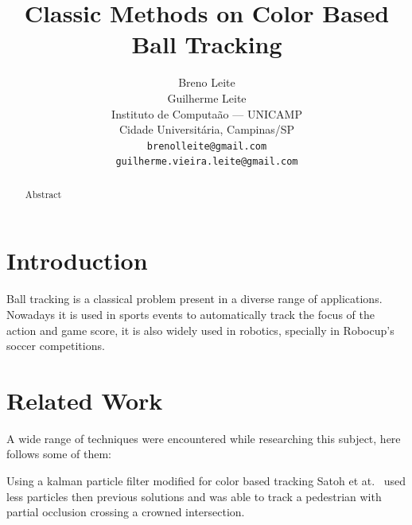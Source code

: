 \documentclass[10pt,twocolumn,letterpaper]{article}
\begin{document}
\title{Classic Methods on Color Based Ball Tracking}

\author{Breno Leite\\ Guilherme Leite\\
Instituto de Computa\cc\~ao --- UNICAMP\\
Cidade Universit\'aria, Campinas/SP\\
{\tt\small brenolleite@gmail.com\\ \tt\small guilherme.vieira.leite@gmail.com}
}

\maketitle

\begin{abstract}
  Abstract
\end{abstract}

\section{Introduction}

  Ball tracking is a classical problem present in a diverse range of
  applications. Nowadays it is used in sports events to automatically track the
  focus of the action and game score, it is also widely used in robotics,
  specially in Robocup’s soccer competitions.


\section{Related Work}

  A wide range of techniques were encountered while researching this subject,
  here follows some of them:

  \bigbreak{}
  Using a kalman particle filter modified for color based tracking
  Satoh et at.~\cite{satoh2004color} used less particles then previous solutions
  and was able to track a pedestrian with partial occlusion crossing a crowned
  intersection.
  
\end{document}
